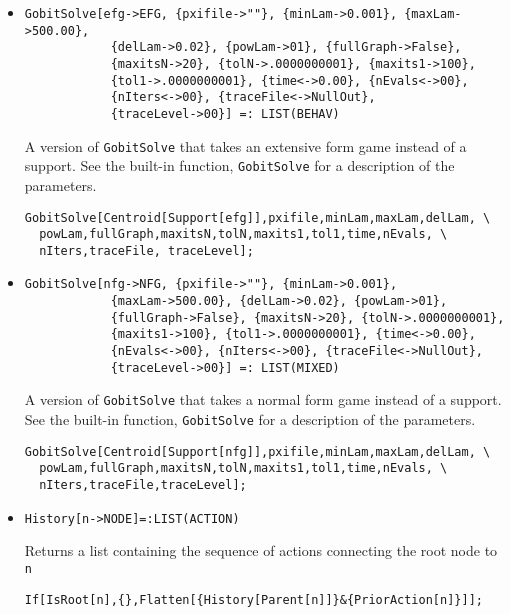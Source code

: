 \begin{itemize}
\item{}
\protect \large \begin{verbatim}
GobitSolve[efg->EFG, {pxifile->""}, {minLam->0.001}, {maxLam->500.00}, 
            {delLam->0.02}, {powLam->01}, {fullGraph->False}, 
            {maxitsN->20}, {tolN->.0000000001}, {maxits1->100}, 
            {tol1->.0000000001}, {time<->0.00}, {nEvals<->00}, 
            {nIters<->00}, {traceFile<->NullOut}, 
            {traceLevel->00}] =: LIST(BEHAV)
\end{verbatim}\normalsize

\bd 
A version of \verb+GobitSolve+ that takes an extensive form
game instead of a support.  See the built-in function,
\verb+GobitSolve+ for a description of the parameters.
\begin{verbatim}
GobitSolve[Centroid[Support[efg]],pxifile,minLam,maxLam,delLam, \
  powLam,fullGraph,maxitsN,tolN,maxits1,tol1,time,nEvals, \
  nIters,traceFile, traceLevel];
\end{verbatim} 
\ed

\item{}
\protect \large \begin{verbatim}
GobitSolve[nfg->NFG, {pxifile->""}, {minLam->0.001}, 
            {maxLam->500.00}, {delLam->0.02}, {powLam->01}, 
            {fullGraph->False}, {maxitsN->20}, {tolN->.0000000001}, 
            {maxits1->100}, {tol1->.0000000001}, {time<->0.00}, 
            {nEvals<->00}, {nIters<->00}, {traceFile<->NullOut}, 
            {traceLevel->00}] =: LIST(MIXED)
\end{verbatim}\normalsize

\bd 
A version of \verb+GobitSolve+ that takes a normal form
game instead of a support.  See the built-in function,
\verb+GobitSolve+ for a description of the parameters.
\begin{verbatim}
GobitSolve[Centroid[Support[nfg]],pxifile,minLam,maxLam,delLam, \
  powLam,fullGraph,maxitsN,tolN,maxits1,tol1,time,nEvals, \
  nIters,traceFile,traceLevel];
\end{verbatim} 
\ed

\item{}
\protect \large \begin{verbatim}
History[n->NODE]=:LIST(ACTION)
\end{verbatim}\normalsize

\bd 
Returns a list containing the sequence of actions connecting the root
node to \verb+n+
\begin{verbatim}
If[IsRoot[n],{},Flatten[{History[Parent[n]]}&{PriorAction[n]}]];
\end{verbatim} 
\ed


\end{itemize}
